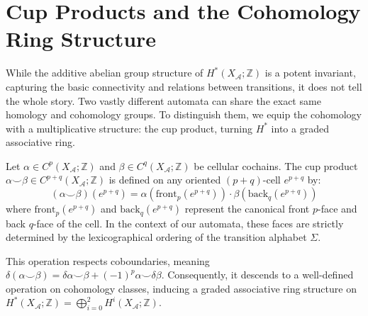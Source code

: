 \section{Cup Products and the Cohomology Ring Structure}

While the additive abelian group structure of $H^*(X_\mathcal{A}; \mathbb{Z})$ is a potent invariant, capturing the basic connectivity and relations between transitions, it does not tell the whole story. Two vastly different automata can share the exact same homology and cohomology groups. To distinguish them, we equip the cohomology with a multiplicative structure: the cup product, turning $H^*$ into a graded associative ring.

\begin{definition}
Let $\alpha \in C^p(X_\mathcal{A}; \mathbb{Z})$ and $\beta \in C^q(X_\mathcal{A}; \mathbb{Z})$ be cellular cochains. The cup product $\alpha \smile \beta \in C^{p+q}(X_\mathcal{A}; \mathbb{Z})$ is defined on any oriented $(p+q)$-cell $e^{p+q}$ by:
\[ (\alpha \smile \beta)(e^{p+q}) = \alpha(\text{front}_p(e^{p+q})) \cdot \beta(\text{back}_q(e^{p+q})) \]
where $\text{front}_p(e^{p+q})$ and $\text{back}_q(e^{p+q})$ represent the canonical front $p$-face and back $q$-face of the cell. In the context of our automata, these faces are strictly determined by the lexicographical ordering of the transition alphabet $\Sigma$.
\end{definition}

This operation respects coboundaries, meaning $\delta(\alpha \smile \beta) = \delta\alpha \smile \beta + (-1)^p \alpha \smile \delta\beta$. Consequently, it descends to a well-defined operation on cohomology classes, inducing a graded associative ring structure on $H^*(X_\mathcal{A}; \mathbb{Z}) = \bigoplus_{i=0}^2 H^i(X_\mathcal{A}; \mathbb{Z})$.

